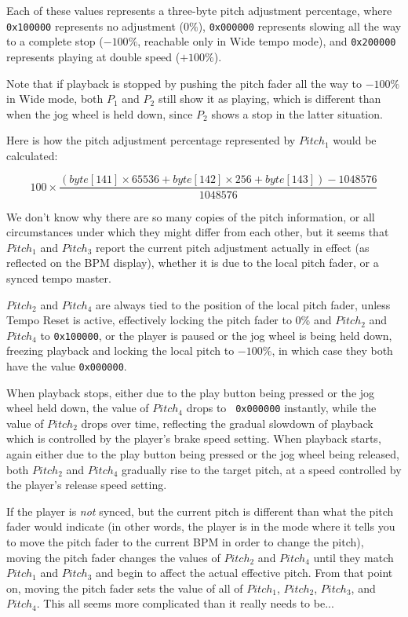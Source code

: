 \documentclass[11pt]{article}
\begin{document}
Each of these values represents a three-byte pitch adjustment
percentage, where {\tt 0x100000} represents no adjustment ($0\%$),
{\tt 0x000000} represents slowing all the way to a complete stop
($-100\%$, reachable only in Wide tempo mode), and {\tt 0x200000}
represents playing at double speed ($+100\%$).

Note that if playback is stopped by pushing the pitch fader all the
way to $-100\%$ in Wide mode, both $P_1$ and $P_2$ still show it as
playing, which is different than when the jog wheel is held down,
since $P_2$ shows a stop in the latter situation.

Here is how the pitch adjustment percentage represented by $Pitch_1$
would be calculated:

\begin{displaymath}
  100 \times
  \frac{(byte[141] \times 65536 + byte[142]  \times 256 + byte[143]) - 1048576}{1048576}
\end{displaymath}

We don't know why there are so many copies of the pitch information,
or all circumstances under which they might differ from each other,
but it seems that $Pitch_1$ and $Pitch_3$ report the current pitch
adjustment actually in effect (as reflected on the BPM display),
whether it is due to the local pitch fader, or a synced tempo master.

$Pitch_2$ and $Pitch_4$ are always tied to the position of the local
pitch fader, unless Tempo Reset is active, effectively locking the
pitch fader to 0\% and $Pitch_2$ and $Pitch_4$ to {\tt 0x100000}, or
the player is paused or the jog wheel is being held down, freezing
playback and locking the local pitch to $-100\%$, in which case they
both have the value {\tt 0x000000}.

When playback stops, either due to the play button being pressed or
the jog wheel held down, the value of $Pitch_4$ drops to {\tt
  0x000000} instantly, while the value of $Pitch_2$ drops over time,
reflecting the gradual slowdown of playback which is controlled by the
player's brake speed setting. When playback starts, again either due
to the play button being pressed or the jog wheel being released, both
$Pitch_2$ and $Pitch_4$ gradually rise to the target pitch, at a speed
controlled by the player's release speed setting.

If the player is \emph{not} synced, but the current pitch is different
than what the pitch fader would indicate (in other words, the player
is in the mode where it tells you to move the pitch fader to the
current BPM in order to change the pitch), moving the pitch fader
changes the values of $Pitch_2$ and $Pitch_4$ until they match
$Pitch_1$ and $Pitch_3$ and begin to affect the actual effective
pitch. From that point on, moving the pitch fader sets the value of
all of $Pitch_1$, $Pitch_2$, $Pitch_3$, and $Pitch_4$. This all seems
more complicated than it really needs to be...
\end{document}
